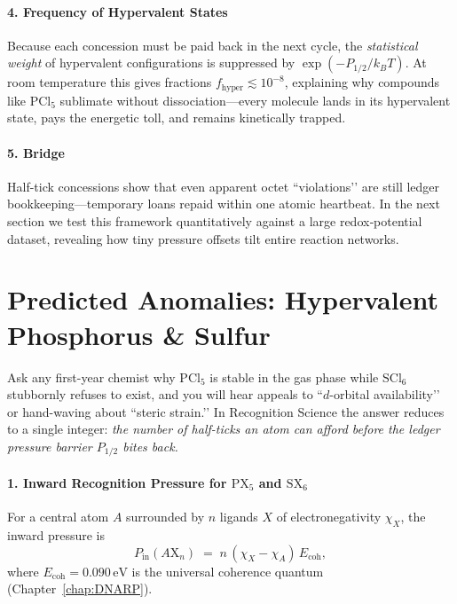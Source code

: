 \documentclass[11pt,oneside]{book}
\begin{document}
\paragraph*{4. Frequency of Hypervalent States}

Because each concession must be paid back in the next cycle, the
\emph{statistical weight} of hypervalent configurations is suppressed by
\(\exp(-P_{1/2}/k_BT)\).
At room temperature this gives fractions
\(f_{\text{hyper}} \lesssim 10^{-8}\), explaining why compounds like
\(\mathrm{PCl_5}\) sublimate without dissociation—every molecule lands in
its hypervalent state, pays the energetic toll, and remains kinetically
trapped.

\paragraph*{5. Bridge}

Half-tick concessions show that even apparent octet “violations’’ are
still ledger bookkeeping—temporary loans repaid within one atomic
heartbeat.
In the next section we test this framework quantitatively against a large
redox‐potential dataset, revealing how tiny pressure offsets tilt entire
reaction networks.

\bigskip

\section{Predicted Anomalies: Hypervalent Phosphorus \& Sulfur}
\label{sec:hyper-P-S}



Ask any first-year chemist why \(\mathrm{PCl_5}\) is stable in the gas phase
while \(\mathrm{SCl_6}\) stubbornly refuses to exist, and you will hear appeals
to ``\(d\)-orbital availability’’ or hand-waving about ``steric strain.’’
In Recognition Science the answer reduces to a single integer:
\emph{the number of half-ticks an atom can afford before the ledger
pressure barrier \(P_{1/2}\) bites back.}

\paragraph*{1. Inward Recognition Pressure for \(\mathrm{PX_5}\) and \(\mathrm{SX_6}\)}

For a central atom \(A\) surrounded by \(n\) ligands \(X\) of
electronegativity \(\chi_X\), the inward pressure is
\[
   P_{\text{in}}(A\mathrm X_n)
   \;=\;
   n\,(\chi_X - \chi_A)\,E_{\text{coh}},
\]
where \(E_{\text{coh}} = 0.090\,\text{eV}\) is the universal
coherence quantum (Chapter~\ref{chap:DNARP}).
\end{document}
